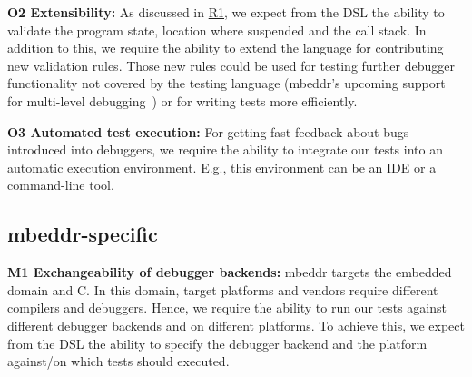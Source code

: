 \noindent \textbf{\label{O2}O2 Extensibility:} As discussed in
\hyperref[R1]{R1}, 
we expect from the \ac{DSL} the ability to validate the program state, location
where suspended and the call stack. In addition to this, we
require the ability to extend the language for contributing new
validation rules. Those new rules could be used for testing further debugger
functionality not covered by the testing language (\eg mbeddr's upcoming support
for multi-level
debugging~\cite{MultiLevelDebugging:WSRE:breakedForInlining}) 
or for writing tests more efficiently.


\noindent \textbf{\label{O3}O3 Automated test execution:} For getting fast
feedback about bugs introduced into debuggers, 
we require the ability to integrate our 
tests into an automatic execution environment. E.g., this environment can be
an \ac{IDE} or a command-line tool. 

\subsection{mbeddr-specific}
\noindent \textbf{\label{M1}M1 Exchangeability of debugger backends:}
mbeddr targets the embedded domain and C. In this domain, target platforms and
vendors require different compilers and debuggers. 
Hence, we require the ability to run our tests against
different debugger backends and on different platforms. To achieve this,
we expect from the \ac{DSL} the ability to specify the debugger backend
and the platform against/on which tests should executed.

